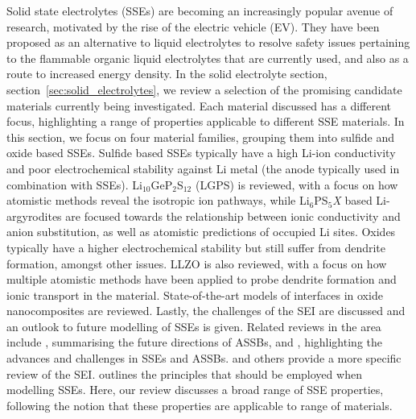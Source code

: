 \documentclass[../main.tex]{subfiles}
\begin{document}
Solid state electrolytes (SSEs) are becoming an increasingly popular avenue of research, motivated by the rise of the electric vehicle (EV). \cite{Woods_2021} They have been proposed as an alternative to liquid electrolytes to resolve safety issues pertaining to the flammable organic liquid electrolytes that are currently used,\cite{Shepherd_Siddiqui, Pfrang2017} and also as a route to increased energy density\cite{Liu2019_e_den}. In the solid electrolyte section, section~\ref{sec:solid_electrolytes}, we review a selection of the promising candidate materials currently being investigated. Each material discussed has a different focus, highlighting a range of properties applicable to different SSE materials. In this section, we focus on four material families, grouping them into sulfide and oxide based SSEs. Sulfide based SSEs typically have a high Li-ion conductivity and poor electrochemical stability against Li metal (the anode typically used in combination with SSEs). \cite{Zhu2015, Zhang2019se_rev} Li$_{10}$GeP$_2$S$_{12}$ (LGPS) is reviewed, with a focus on how atomistic methods reveal the isotropic ion pathways, while Li$_6$PS$_5$\textit{X} based Li-argyrodites are focused towards the relationship between ionic conductivity and anion substitution, as well as atomistic predictions of occupied Li sites. Oxides typically have a higher electrochemical stability but still suffer from dendrite formation, amongst other issues.\cite{Zhu2015} LLZO is also reviewed, with a focus on how multiple atomistic methods have been applied to probe dendrite formation and ionic transport in the material. State-of-the-art models of interfaces in oxide nanocomposites are reviewed. Lastly, the challenges of the SEI are discussed and an outlook to future modelling of SSEs is given. Related reviews in the area include \citeauthor{Zhang2018se_review}, \cite{Zhang2018se_review} summarising the future directions of ASSBs, and \citeauthor{Gurung2019}, \cite{Gurung2019} highlighting the advances and challenges in SSEs and ASSBs. \citeauthor{Xiao2020interfacerev}\cite{Xiao2020interfacerev} and others\cite{Xu2018exp,Tateyama2019} provide a more specific review of the SEI. \citeauthor{Ceder2018} \cite{Ceder2018} outlines the principles that should be employed when modelling SSEs. Here, our review discusses a broad range of SSE properties, following the notion that these properties are applicable to range of materials.
\end{document}
